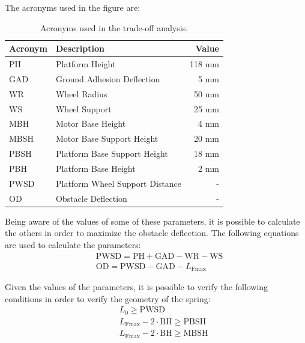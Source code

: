 \documentclass[11pt]{article}
\begin{document}
\newpage
\noindent
The acronyms used in the figure are:
\begin{table}[H]
    \centering
    \begin{tabular}{|l|l|r|}
        \rowcolor{blue!5}
        \hline
        \textbf{Acronym} & \textbf{Description} & \textbf{Value} \\
        \hline
        PH    & Platform Height                  & 118 mm \\
        GAD   & Ground Adhesion Deflection       & 5 mm \\
        WR    & Wheel Radius                     & 50 mm \\
        WS    & Wheel Support                    & 25 mm \\
        MBH   & Motor Base Height                & 4 mm \\
        MBSH  & Motor Base Support Height        & 20 mm \\
        PBSH  & Platform Base Support Height     & 18 mm \\
        PBH   & Platform Base Height             & 2 mm \\
        PWSD  & Platform Wheel Support Distance  & -\\
        OD    & Obstacle Deflection              & -\\
        \hline
    \end{tabular}
    \caption{Acronyms used in the trade-off analysis.}
    \label{tab:trade_off_analysis_acronyms}
\end{table}

Being aware of the values of some of these parameters, it is possible to calculate the others in order to maximize the obstacle deflection. The following equations are used to calculate the parameters:
\begin{align}
    & \text{PWSD} = \text{PH} + \text{GAD} - \text{WR} - \text{WS} \\
    & \text{OD} = \text{PWSD} - \text{GAD} - L_ \text{Fmax}
\end{align}

Given the values of the parameters, it is possible to verify the following conditions in order to verify the geometry of the spring:
\begin{align}
    & \quad  L_0 \geq \text{PWSD} \\
    & \quad  L_\text{Fmax} - 2 \cdot \text{BH} \geq \text{PBSH} \\
    & \quad  L_\text{Fmax} - 2 \cdot \text{BH} \geq \text{MBSH}
\end{align}
\end{document}
